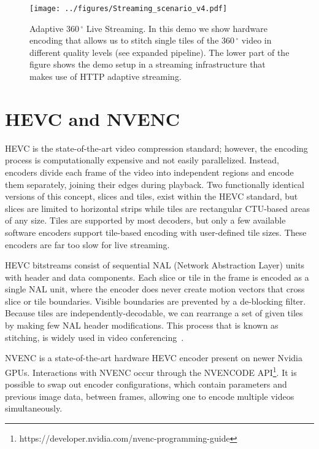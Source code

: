 \renewcommand{\figurename}{Fig.}
\begin{figure*}[t]
	\centering
	\texttt{[image: ../figures/Streaming\_scenario\_v4.pdf]}
	\caption{Adaptive $360\,^{\circ}$ Live Streaming. In this demo we show hardware encoding that allows us to stitch single tiles of the $360\,^{\circ}$ video in different quality levels (see expanded pipeline). The lower part of the figure shows the demo setup in a streaming infrastructure that makes use of HTTP adaptive streaming.}
	\label{fig:pipeline}
\end{figure*}

\vspace{-10pt}
\section{HEVC and NVENC} \label{hevc}

HEVC is the state-of-the-art video compression standard; however, the encoding process is computationally expensive and not easily parallelized. Instead, encoders divide each frame of the video into independent regions and encode them separately, joining their edges during playback. Two functionally identical versions of this concept, slices and tiles, exist within the HEVC standard, but slices are limited to horizontal strips while tiles are rectangular CTU-based areas of any size.
Tiles are supported by most decoders, but only a few available software encoders support tile-based encoding with user-defined tile sizes. These encoders are far too slow for live streaming.

HEVC bitstreams consist of sequential NAL (Network Abstraction Layer) units with header and data components.
Each slice or tile in the frame is encoded as a single NAL unit, where the encoder does never create motion vectors that cross slice or tile boundaries. Visible boundaries are prevented by a de-blocking filter.
Because tiles are independently-decodable, we can rearrange a set of given tiles by making few NAL header modifications. This process that is known as stitching, is widely used in video conferencing~\cite{amon2012,feldmann2013,delafuente2017}.

NVENC is a state-of-the-art hardware HEVC encoder present on newer Nvidia GPUs. Interactions with NVENC occur through the NVENCODE API\footnote{https://developer.nvidia.com/nvenc-programming-guide}. It is possible to swap out encoder configurations, which contain parameters and previous image data, between frames, allowing one to encode multiple videos simultaneously.

